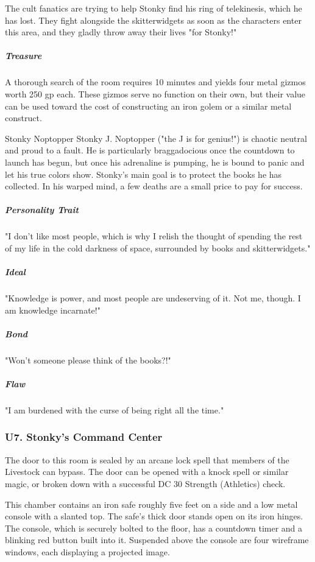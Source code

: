 \documentclass[10pt,a4paper,twoside,bg=print,twocolumn,openany,nodeprecatedcode]{dndbook}
\begin{document}
The cult fanatics are trying to help Stonky find his ring of telekinesis, which he has lost. They fight alongside the skitterwidgets as soon as the characters enter this area, and they gladly throw away their lives "for Stonky!"

\subparagraph{Treasure}
A thorough search of the room requires 10 minutes and yields four metal gizmos worth 250 gp each. These gizmos serve no function on their own, but their value can be used toward the cost of constructing an iron golem or a similar metal construct.

\begin{DndSidebar}[float=!b]{Stonky Noptopper}
Stonky J. Noptopper ("the J is for genius!") is chaotic neutral and proud to a fault. He is particularly braggadocious once the countdown to launch has begun, but once his adrenaline is pumping, he is bound to panic and let his true colors show. Stonky's main goal is to protect the books he has collected. In his warped mind, a few deaths are a small price to pay for success.



\subparagraph{Personality Trait}
"I don't like most people, which is why I relish the thought of spending the rest of my life in the cold darkness of space, surrounded by books and skitterwidgets."



\subparagraph{Ideal}
"Knowledge is power, and most people are undeserving of it. Not me, though. I am knowledge incarnate!"



\subparagraph{Bond}
"Won't someone please think of the books?!"



\subparagraph{Flaw}
"I am burdened with the curse of being right all the time."



\end{DndSidebar}

\subsubsection{U7. Stonky's Command Center}
The door to this room is sealed by an arcane lock spell that members of the Livestock can bypass. The door can be opened with a knock spell or similar magic, or broken down with a successful DC 30 Strength (Athletics) check.

\begin{DndReadAloud}{}
This chamber contains an iron safe roughly five feet on a side and a low metal console with a slanted top. The safe's thick door stands open on its iron hinges. The console, which is securely bolted to the floor, has a countdown timer and a blinking red button built into it. Suspended above the console are four wireframe windows, each displaying a projected image.

\end{DndReadAloud}
\end{document}
